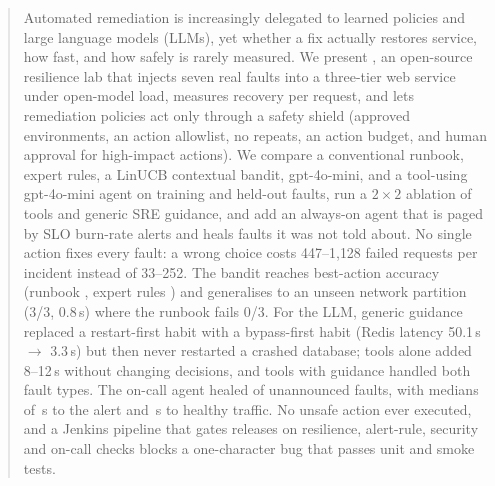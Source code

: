 \begin{abstract}
Automated remediation is increasingly delegated to learned policies and large language models
(LLMs), yet whether a fix actually restores service, how fast, and how safely is rarely measured. We
present \sys{}, an open-source resilience lab that injects seven real faults into a three-tier web
service under open-model load, measures recovery per request, and lets remediation policies act only
through a safety shield (approved environments, an action allowlist, no repeats, an action budget,
and human approval for high-impact actions). We compare a conventional runbook, expert rules, a
LinUCB contextual bandit, gpt-4o-mini, and a tool-using gpt-4o-mini agent on training and held-out
faults, run a $2\times2$ ablation of tools and generic SRE guidance, and add an always-on agent that is
paged by SLO burn-rate alerts and heals faults it was not told about. No single action fixes every
fault: a wrong choice costs 447--1{,}128 failed requests per incident instead of 33--252. The bandit
reaches \lcBandit{} best-action accuracy (runbook \lcRunbook{}, expert rules \lcHeuristic{}) and
generalises to an unseen network partition (3/3, 0.8\,s) where the runbook fails 0/3. For the LLM,
generic guidance replaced a restart-first habit with a bypass-first habit (Redis latency
50.1\,s $\rightarrow$ 3.3\,s) but then never restarted a crashed database; tools alone added 8--12\,s
without changing decisions, and tools with guidance handled both fault types. The on-call agent
healed \ocHealed{} of \ocFaults{} unannounced faults, with medians of \ocMedDetect\,s to the alert and
\ocMedRecover\,s to healthy traffic. No unsafe action ever executed, and a Jenkins pipeline that gates
releases on resilience, alert-rule, security and on-call checks blocks a one-character bug that
passes unit and smoke tests.
\end{abstract}
